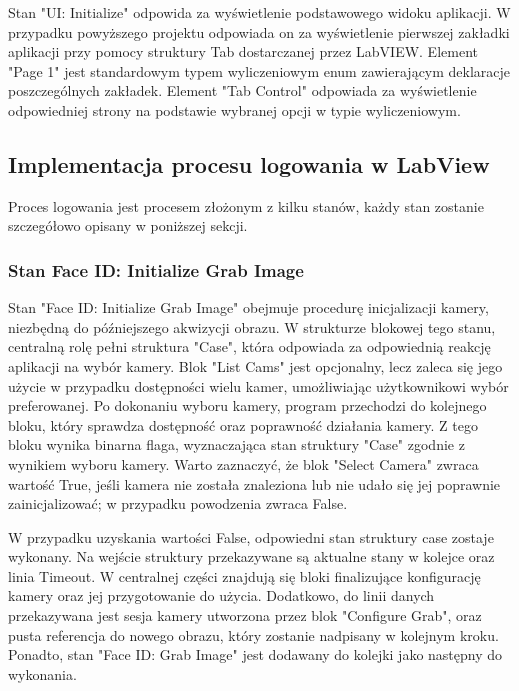 \documentclass{report}
\begin{document}
Stan "UI: Initialize" odpowida za wyświetlenie podstawowego widoku aplikacji. W przypadku powyższego projektu odpowiada on za wyświetlenie 
pierwszej zakładki aplikacji przy pomocy struktury Tab dostarczanej przez LabVIEW. 
Element "Page 1" jest standardowym typem wyliczeniowym enum zawierającym deklaracje poszczególnych zakładek. 
Element "Tab Control" odpowiada za wyświetlenie odpowiedniej strony na podstawie wybranej opcji w typie wyliczeniowym.


\subsection{\Large Implementacja procesu logowania w LabView}
Proces logowania jest procesem złożonym z kilku stanów, każdy stan zostanie szczegółowo opisany w poniższej sekcji. 

\subsubsection{\large Stan Face ID: Initialize Grab Image}
Stan "Face ID: Initialize Grab Image" obejmuje procedurę inicjalizacji kamery, niezbędną do późniejszego akwizycji obrazu. W strukturze blokowej tego stanu, centralną rolę pełni struktura "Case", która odpowiada za odpowiednią reakcję aplikacji na wybór kamery. Blok "List Cams" jest opcjonalny, lecz zaleca się jego użycie w przypadku dostępności wielu kamer, umożliwiając użytkownikowi wybór preferowanej. Po dokonaniu wyboru kamery, program przechodzi do kolejnego bloku, który sprawdza dostępność oraz poprawność działania kamery. Z tego bloku wynika binarna flaga, wyznaczająca stan struktury "Case" zgodnie z wynikiem wyboru kamery. Warto zaznaczyć, że blok "Select Camera" zwraca wartość True, jeśli kamera nie została znaleziona lub nie udało się jej poprawnie zainicjalizować; w przypadku powodzenia zwraca False.

W przypadku uzyskania wartości False, odpowiedni stan struktury case zostaje wykonany. Na wejście struktury przekazywane są aktualne stany w kolejce oraz linia Timeout. W centralnej części znajdują się bloki finalizujące konfigurację kamery oraz jej przygotowanie do użycia. Dodatkowo, do linii danych przekazywana jest sesja kamery utworzona przez blok "Configure Grab", oraz pusta referencja do nowego obrazu, który zostanie nadpisany w kolejnym kroku. Ponadto, stan "Face ID: Grab Image" jest dodawany do kolejki jako następny do wykonania.
\end{document}
